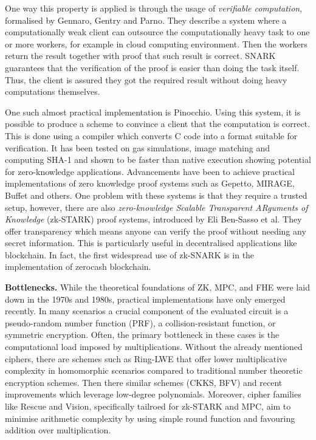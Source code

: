 \documentclass{Resources/UoBLab1}
\theoremstyle{definition}
\begin{document}
One way this property is applied is through the usage of \textit{verifiable computation}, formalised by Gennaro, Gentry and Parno\cite{UntrustedWorkers}. They describe a system where a computationally weak client can outsource the computationally heavy task to one or more workers, for example in cloud computing environment. Then the workers return the result together with proof that such result is correct. SNARK guarantees that the verification of the proof is easier than doing the task itself. Thus, the client is assured they got the required result without doing heavy computations themselves.

One such almost practical implementation is Pinocchio\cite{Pinocchio}. Using this system, it is possible to produce a scheme to convince a client that the computation is correct. This is done using a compiler which converts C code into a format suitable for verification. It has been tested on gas simulations, image matching and computing SHA-1 and shown to be faster than native execution showing potential for zero-knowledge applications. Advancements have been to achieve practical implementations of zero knowledge proof systems such as Gepetto\cite{Gepetto}, MIRAGE\cite{Mirage}, Buffet\cite{Buffet} and others. One problem with these systems is that they require a trusted setup, however, there are also \textit{zero-knowledge Scalable Transparent ARguments of Knowledge} (zk-STARK) proof systems, introduced by Eli Ben-Sasso et al\cite{STARK}. They offer transparency which means anyone can verify the proof without needing any secret information. This is particularly useful in decentralised applications like blockchain. In fact, the first widespread use of zk-SNARK is in the implementation of zerocash blockchain\cite{zcash}.\medskip

\noindent\textbf{Bottlenecks.} While the theoretical foundations of ZK, MPC, and FHE were laid down in the 1970s and 1980s, practical implementations have only emerged recently. In many scenarios a crucial component of the evaluated circuit is a pseudo-random number function (PRF), a collision-resistant function, or symmetric encryption. Often, the primary bottleneck in these cases is the computational load imposed by multiplications. Without the already mentioned ciphers, there are schemes such as Ring-LWE\cite{RINGLWE} that offer lower multiplicative complexity in homomorphic scenarios compared to traditional number theoretic encryption schemes. Then there similar schemes (CKKS\cite{CKKS}, BFV\cite{BFV1}\cite{BFV2}) and recent improvements\cite{BFVImprov} which leverage low-degree polynomials. Moreover, cipher families like Rescue and Vision\cite{Rescue}, specifically tailroed for zk-STARK and MPC, aim to minimise arithmetic complexity by using simple round function and favouring addition over multiplication.
\end{document}
